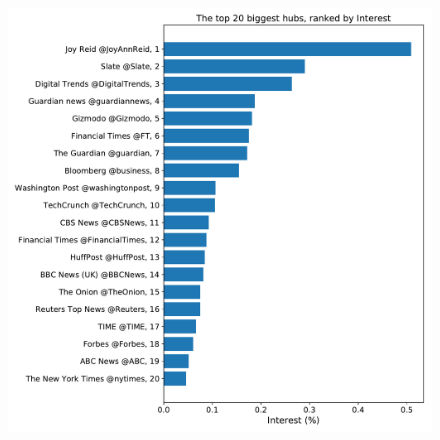 \documentclass[11pt, twoside]{report}
\begin{document}
    \begin{figure}[htbp]
      \centering
      \includegraphics[width=\textwidth]{../../scripts/network_analysis/imgs/hubs_interest.pdf}            
      \caption{}
    \end{figure}
    
\end{document}
